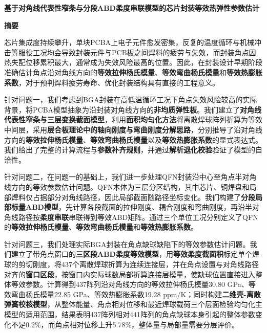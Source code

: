 \documentclass[draft,12pt,a4paper]{ctexart}
\theoremstyle{definition}
\begin{document}
\newcommand{\keywords}[1]{\par\vspace{6pt}\noindent\textbf{关键词：#1}\par}
\renewcommand{\lstlistingname}{代码}

\begin{center}
  {\bfseries 基于\textbf{对角线代表性窄条与分段ABD柔度串联模型}的芯片封装\textbf{等效热弹性参数}估计\par}
\end{center}

\begin{center}
  {\bfseries \textbf{摘\quad 要}}
\end{center}
\vspace{0.1cm}

芯片集成度持续攀升，单块PCBA上电子元件愈发密集，反复的温度循环与机械冲击等服役工况均会导致封装元件与PCB板之间焊料的疲劳与失效，而封装角点因热失配位移累积最大，通常成为失效风险最高的位置。因此，在封装设计早期阶段准确估计角点沿对角线方向的\textbf{等效拉伸杨氏模量}、\textbf{等效弯曲杨氏模量}和\textbf{等效热膨胀系数}，对于预判焊料疲劳寿命、优化封装结构具有直接的工程意义。

针对问题一，我们考虑到BGA封装在高低温循环工况下角点失效风险较高的实际背景，将PCBA模型抽象为沿封装对角线方向的\textbf{非均质弹性板}。我们建立了\textbf{对角线代表性窄条与三层变换截面模型}，利用\textbf{面积均匀化方法}将离散焊球阵列折算为等效中间层，采用\textbf{层合板理论中的轴向刚度与弯曲刚度分解思路}，分别推导了沿对角线方向的\textbf{等效拉伸杨氏模量}、\textbf{等效弯曲杨氏模量}以及\textbf{等效热膨胀系数}的显式表达式。我们给出了完整的计算流程与\textbf{参数补齐规则}，并通过\textbf{解析退化校验}验证了模型的自洽性。

针对问题二，在问题一的基础上，我们进一步处理QFN封装沿中心至角点半对角线方向的等效参数估计问题。QFN本体为三层分区结构，其中芯片、铜焊盘和局部焊料仅占据部分对角线路径，因此局部截面随路径坐标变化。我们构建了\textbf{分段局部标量ABD模型}，先计算各段截面的拉伸刚度、耦合刚度和弯曲刚度，再沿半对角线路径按\textbf{柔度串联}串联得到等效ABD矩阵。通过三个单位工况分别定义了QFN的\textbf{等效拉伸杨氏模量}、\textbf{等效弯曲杨氏模量}和\textbf{等效热膨胀系数}。

针对问题三，我们处理实际BGA封装在角点缺球缺陷下的等效参数估计问题。我们建立了带角点窗口的\textbf{三区段ABD柔度等效模型}，用\textbf{等效柔度截面积}标定单个焊球的剪切刚度，将437个离散焊球折算为连续连接层，并在角点设置与对角线路径对齐的\textbf{窗口区段}，按窗口内实际球数局部折算连接层模量，使缺球位置直接进入整体等效参数。计算得到437阵列沿对角线方向的等效拉伸杨氏模量30.80 GPa、等效弯曲杨氏模量22.85 GPa、等效热膨胀系数19.28 ppm/K；同时构建\textbf{二维壳-离散弹簧校核模型}，从整体能量、角点相对位移和最近焊球载荷三个层面检验均匀化主模型的适用范围，结果表明437阵列相对441阵列的角点缺球本身引起的整体参数变化不足0.2\%，而角点相对位移上升5.78\%，整体量与局部量需要分层评价。
\end{document}
